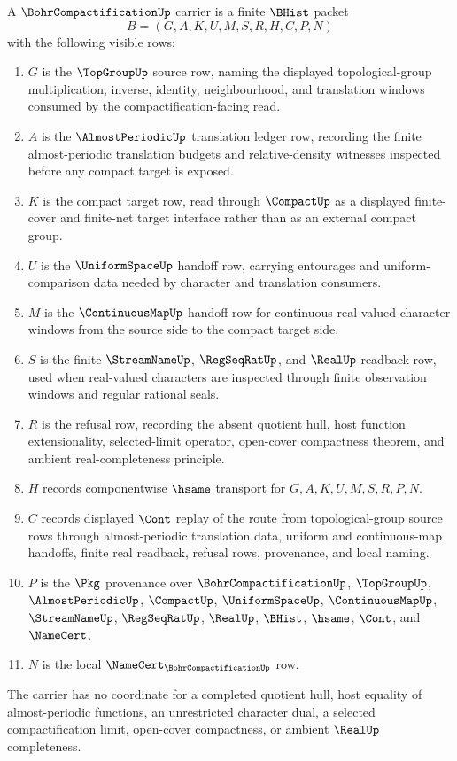 \begin{definition}
\label{def:bohr-compactification-carrier}
A $\BohrCompactificationUp$ carrier is a finite $\BHist$ packet
$$
B=(G,A,K,U,M,S,R,H,C,P,N)
$$
with the following visible rows:
\begin{enumerate}
\item $G$ is the $\TopGroupUp$ source row, naming the displayed topological-group multiplication, inverse, identity, neighbourhood, and translation windows consumed by the compactification-facing read.
\item $A$ is the $\AlmostPeriodicUp$ translation ledger row, recording the finite almost-periodic translation budgets and relative-density witnesses inspected before any compact target is exposed.
\item $K$ is the compact target row, read through $\CompactUp$ as a displayed finite-cover and finite-net target interface rather than as an external compact group.
\item $U$ is the $\UniformSpaceUp$ handoff row, carrying entourages and uniform-comparison data needed by character and translation consumers.
\item $M$ is the $\ContinuousMapUp$ handoff row for continuous real-valued character windows from the source side to the compact target side.
\item $S$ is the finite $\StreamNameUp$, $\RegSeqRatUp$, and $\RealUp$ readback row, used when real-valued characters are inspected through finite observation windows and regular rational seals.
\item $R$ is the refusal row, recording the absent quotient hull, host function extensionality, selected-limit operator, open-cover compactness theorem, and ambient real-completeness principle.
\item $H$ records componentwise $\hsame$ transport for $G,A,K,U,M,S,R,P,N$.
\item $C$ records displayed $\Cont$ replay of the route from topological-group source rows through almost-periodic translation data, uniform and continuous-map handoffs, finite real readback, refusal rows, provenance, and local naming.
\item $P$ is the $\Pkg$ provenance over $\BohrCompactificationUp$, $\TopGroupUp$, $\AlmostPeriodicUp$, $\CompactUp$, $\UniformSpaceUp$, $\ContinuousMapUp$, $\StreamNameUp$, $\RegSeqRatUp$, $\RealUp$, $\BHist$, $\hsame$, $\Cont$, and $\NameCert$.
\item $N$ is the local $\NameCert_{\BohrCompactificationUp}$ row.
\end{enumerate}
The carrier has no coordinate for a completed quotient hull, host equality of almost-periodic functions, an unrestricted character dual, a selected compactification limit, open-cover compactness, or ambient $\RealUp$ completeness.
\end{definition}

